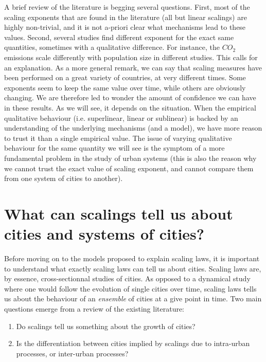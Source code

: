 A brief review of the literature is begging several questions. First, most of
the scaling exponents that are found in the literature (all but linear scalings)
are highly non-trivial, and it is not a-priori clear what mechanisms lead to
these values. Second, several studies find different exponent for the exact same
quantities, sometimes with a qualitative difference. For instance, the $CO_2$
emissions scale differently with population size in different studies. This
calls for an explanation.  As a more general remark, we can say that scaling
measures have been performed on a great variety of countries, at very different
times. Some exponents seem to keep the same value over time, while others are
obviously changing. We are therefore led to wonder the amount of confidence we
can have in these results.  As we will see, it depends on the situation. When
the empirical qualitative behaviour (i.e. superlinear, linear or sublinear) is
backed by an understanding of the underlying mechanisms (and a model), we have
more reason to trust it than a single empirical value. The issue of varying
qualitative behaviour for the same quantity we will see is the symptom of a
more fundamental problem in the study of urban systems (this is also the reason
why we cannot trust the exact value of scaling exponent, and cannot compare them
from one system of cities to another).

\section{What can scalings tell us about cities and systems of
cities?}
\label{sub:what_can_scalings_tell_us_about_cities_and_systems_of_cities_}

Before moving on to the models proposed to explain scaling laws, 
it is important to understand what exactly scaling laws can tell us about
cities. Scaling laws are, by essence, cross-sectionnal studies of cities. As
opposed to a dynamical study where one would follow the evolution of single
cities over time, scaling laws tells us about the behaviour of an
\emph{ensemble} of cities at a give point in time. Two main questions emerge
from a review of the existing literature:

\begin{enumerate}
    \item Do scalings tell us something about the growth of cities?
    \item Is the differentiation between cities implied by scalings due to
        intra-urban processes, or inter-urban processes?
\end{enumerate}

